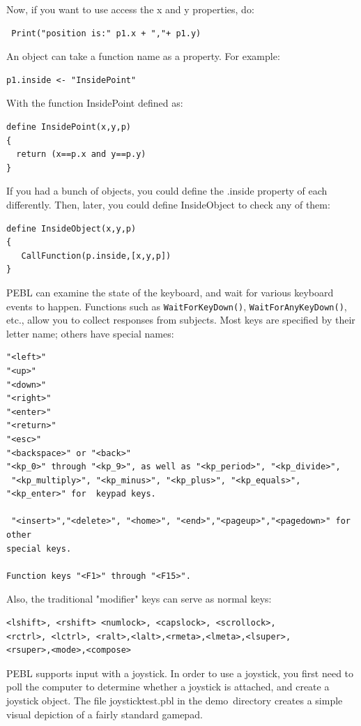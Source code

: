 Now, if you want to use access the x and y properties, do:
\begin{verbatim}
 Print("position is:" p1.x + ","+ p1.y) 
\end{verbatim}

An object can take a function name as a property.  For example:
\begin{verbatim}
p1.inside <- "InsidePoint"
\end{verbatim}
With the function InsidePoint defined as:
\begin{verbatim}
define InsidePoint(x,y,p)
{
  return (x==p.x and y==p.y)
}
\end{verbatim}

If you had a bunch of objects, you could define the .inside property of each differently. Then, later, you could define InsideObject to check any of them:
\begin{verbatim}
define InsideObject(x,y,p)
{
   CallFunction(p.inside,[x,y,p])
}
\end{verbatim}




PEBL can examine the state of the keyboard, and wait for various
keyboard events to happen. Functions such as
\texttt{WaitForKeyDown()}, \texttt{WaitForAnyKeyDown()}, etc., allow
you to collect responses from subjects. Most keys are specified by
their letter name; others have special names:
\begin{verbatim}
"<left>"
"<up>"
"<down>"
"<right>"
"<enter>"
"<return>"
"<esc>"
"<backspace>" or "<back>"
"<kp_0>" through "<kp_9>", as well as "<kp_period>", "<kp_divide>",
 "<kp_multiply>", "<kp_minus>", "<kp_plus>", "<kp_equals>",
"<kp_enter>" for  keypad keys.

 "<insert>","<delete>", "<home>", "<end>","<pageup>","<pagedown>" for other
special keys.

Function keys "<F1>" through "<F15>".
\end{verbatim}

Also, the traditional "modifier" keys can serve as normal keys:

\begin{verbatim}
<lshift>, <rshift> <numlock>, <capslock>, <scrollock>, 
<rctrl>, <lctrl>, <ralt>,<lalt>,<rmeta>,<lmeta>,<lsuper>,
<rsuper>,<mode>,<compose>

\end{verbatim}


PEBL supports input with a joystick. In order to use a joystick, you first need to poll the computer to determine whether a joystick is attached, and create a joystick object.  The file joysticktest.pbl in the demo\ directory creates a simple visual depiction of a fairly standard gamepad.


